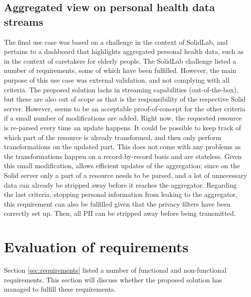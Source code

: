 \subsection{Aggregated view on personal health data streams}
The final use case was based on a challenge in the context of SolidLab, and pertains
to a dashboard that highlights aggregated personal health data, such as in the context of caretakers for elderly people. The SolidLab challenge listed a number of requirements, some of which have been fulfilled. However, the main purpose of this use case was external validation, and not complying with all criteria. 
The proposed solution lacks in streaming capabilities (out-of-the-box), but these are also out of scope as that is the responsibility of the respective Solid server. 
However, \middleware{} seems to be an acceptable proof-of-concept for the other criteria if a small number of modifications are added. Right now, the requested resource is re-parsed every time an update happens. It could be possible to keep track of which part of the resource is already transformed, and then only perform transformations on the updated part. This does not come with any problems as the transformations happen on a record-by-record basis and are stateless. Given this small modification, \middleware{} allows efficient updates of the aggregation; since on the Solid server only a part of a resource needs to be parsed, and a lot of unnecessary data can already be stripped away before it reaches the aggregator. 
Regarding the last criteria, stopping personal information from leaking to the aggregator, this requirement can also be fulfilled given that the privacy filters have been correctly set up. Then, all \gls{PII} can be stripped away before being transmitted.

\section{Evaluation of requirements}
Section \ref{sec:requirements} listed a number of functional and non-functional requirements. This section will discuss whether the proposed solution has managed to fulfill these requirements.

